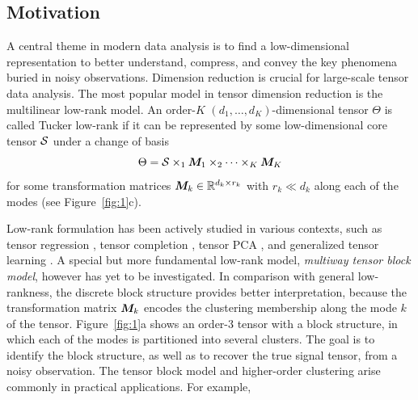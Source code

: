 \documentclass[11pt]{article}
\theoremstyle{exampstyle}
\theoremstyle{definition}
\begin{document}
\subsection{Motivation}
\vspace{-.3cm}
A central theme in modern data analysis is to find a low-dimensional representation to better understand, compress, and convey the key phenomena buried in noisy observations. Dimension reduction is crucial for large-scale tensor data analysis. The most popular model in tensor dimension reduction is the multilinear low-rank model. An order-$K$ $(d_1,\ldots,d_K)$-dimensional tensor $\Theta$ is called Tucker low-rank if it can be represented by some low-dimensional core tensor $\mathcal{S}$ under a change of basis
\begin{equation}\label{eq:Tucker-low-rank}
\Theta = \tS \times_1 \mM_1 \times_2 \cdots \times_K \mM_K
\vspace{-.2cm}
\end{equation}
for some transformation matrices $\bm M_k\in\mathbb{R}^{d_k\times r_k}$ with $r_k\ll d_k$ along each of the modes (see Figure~\ref{fig:1}c).  

Low-rank formulation has been actively studied in various contexts, such as tensor regression \cite{zhou2013tensor,wang4}, tensor completion \cite{pmlr-v119-lee20i,gandy2011tensor}, tensor PCA \cite{zhang2018tensor,wang7}, and generalized tensor learning \cite{han2020optimal}. A special but more fundamental low-rank model, \emph{multiway tensor block model}, however has yet to be investigated. In comparison with general low-rankness, the discrete block structure provides better interpretation, because the transformation matrix $\bm M_k$ encodes the clustering membership along the mode $k$ of the tensor. Figure~\ref{fig:1}a shows an order-3 tensor with a block structure, in which each of the modes is partitioned into several clusters. The goal is to identify the block structure, as well as to recover the true signal tensor, from a noisy observation. The tensor block model and higher-order clustering arise commonly in practical applications. For example, 
\end{document}
